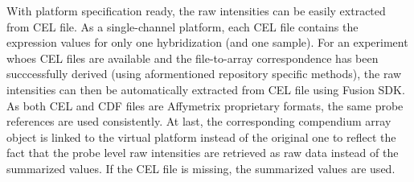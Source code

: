 With platform specification ready, the raw intensities can be easily extracted
from CEL file.
%
As a single-channel platform, each CEL file contains the expression values for
only one hybridization (and one sample).
%
For an experiment whoes CEL files are available and the file-to-array
correspondence has been succcessfully derived (using aformentioned repository
specific methods), the raw intensities can then be automatically extracted
from CEL file using Fusion SDK.
%
As both CEL and CDF files are Affymetrix proprietary formats, the same probe
references are used consistently.
%
At last, the corresponding compendium array object is linked to the virtual
platform instead of the original one to reflect the fact that the probe level
raw intensities are retrieved as raw data instead of the summarized values.
%
If the CEL file is missing, the summarized values are used.
%












